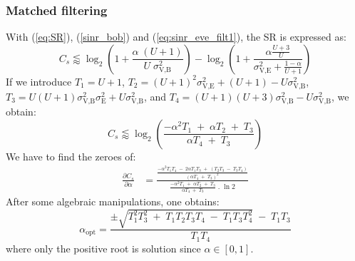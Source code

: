 \documentclass[journal,comsoc]{IEEEtran}
\begin{document}
\subsubsection{Matched filtering}
With (\ref{eq:SR}), (\ref{sinr_bob}) and (\ref{eq:sinr_eve_filt1}), the SR is expressed as:
\begin{equation}
C_s \lessapprox \log_2 \left( 1 +  \frac{\alpha \;(U+1)}{U \; \sigma_{\text{V,B}}^2} \right) - \log_2\left( 1 +  \frac{\alpha \frac{U+3}{U}}{\sigma^2_{\text{V,E}} + \frac{1-\alpha}{U+1}}\right)
\label{eq:SR_anal2_decod_1}
\end{equation}
If we introduce $T_1 = U+1$, $T_2 = (U+1)^2\sigma_{\text{V,E}}^2 + (U+1) - U\sigma_{\text{V,B}}^2$, $T_3 = U(U+1)\sigma_{\text{V,B}}^2\sigma_{\text{E}}^2 + U \sigma_{\text{V,B}}^2$, and $T_4=(U+1)(U+3)\sigma_{\text{V,B}}^2-U\sigma_{\text{V,B}}^2$, we obtain:
\begin{equation}
C_s \lessapprox \log_2 \left( \frac{-\alpha^2 T_1 \; + \; \alpha T_2 \; + \; T_3}{\alpha T_4 \; + \; T_3} \right)
\label{eq:SR_anal2_decod1}
\end{equation}
We have to find the zeroes of:
\begin{equation}
\begin{split}
\frac{\partial C_s}{\partial \alpha} &= \frac{ \frac{-\alpha^2 T_1 T_4 \; - \; 2 \alpha T_1 T_3 \; + \; \left( T_2 T_3 \; - \; T_3 T_4 \right) }{\left( \alpha T_4 \; + \; T_3\right)^2} }{ \frac{-\alpha^2 T_1 \; + \; \alpha T_2 \; + \; T_3}{\alpha T_4 \; + \; T_3} \; . \; \ln{2}} 
\label{eq:SR_derivative}
\end{split}
\end{equation}
After some algebraic manipulations, one obtains: 
\begin{equation}
\alpha_{\text{opt}} = \frac{\pm\sqrt{T_1^2 T_3^2 \; + \; T_1 T_2 T_3 T_4 \; - \; T_1 T_3 T_4^2} \; - \; T_1 T_3}{T_1 T_4}
\label{eq:optimal_alpha_decod_1}
\end{equation}
where only the positive root is solution since $\alpha \in [0,1]$.
\end{document}
